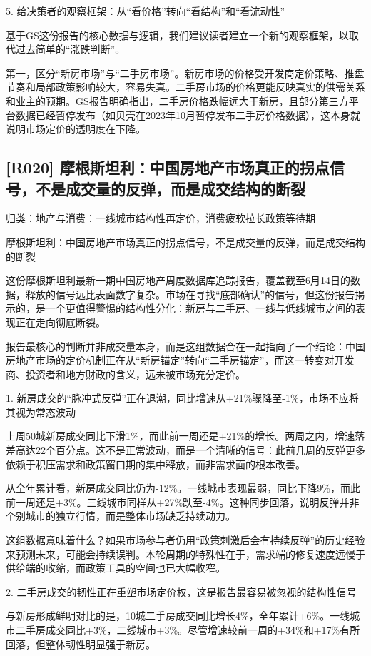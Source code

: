 \documentclass[11pt]{ctexart}
\begin{document}
5. 给决策者的观察框架：从“看价格”转向“看结构”和“看流动性”

基于GS这份报告的核心数据与逻辑，我们建议读者建立一个新的观察框架，以取代过去简单的“涨跌判断”。

第一，区分“新房市场”与“二手房市场”。新房市场的价格受开发商定价策略、推盘节奏和局部政策影响较大，容易失真。二手房市场的价格更能反映真实的供需关系和业主的预期。GS报告明确指出，二手房价格跌幅远大于新房，且部分第三方平台数据已经暂停发布（如贝壳在2023年10月暂停发布二手房价格数据），这本身就说明市场定价的透明度在下降。

\subsection{[R020] 摩根斯坦利：中国房地产市场真正的拐点信号，不是成交量的反弹，而是成交结构的断裂}
{\small\color{refgray}归类：地产与消费：一线城市结构性再定价，消费疲软拉长政策等待期}

摩根斯坦利：中国房地产市场真正的拐点信号，不是成交量的反弹，而是成交结构的断裂

这份摩根斯坦利最新一期中国房地产周度数据库追踪报告，覆盖截至6月14日的数据，释放的信号远比表面数字复杂。市场在寻找“底部确认”的信号，但这份报告揭示的，是一个更值得警惕的结构性分化：新房与二手房、一线与低线城市之间的表现正在走向彻底断裂。

报告最核心的判断并非成交量本身，而是这组数据合在一起指向了一个结论：中国房地产市场的定价机制正在从“新房锚定”转向“二手房锚定”，而这一转变对开发商、投资者和地方财政的含义，远未被市场充分定价。

1. 新房成交的“脉冲式反弹”正在退潮，同比增速从+21\%骤降至-1\%，市场不应将其视为常态波动

上周50城新房成交同比下滑1\%，而此前一周还是+21\%的增长。两周之内，增速落差高达22个百分点。这不是正常波动，而是一个清晰的信号：此前几周的反弹更多依赖于积压需求和政策窗口期的集中释放，而非需求面的根本改善。

从全年累计看，新房成交同比仍为-12\%。一线城市表现最弱，同比下降9\%，而此前一周还是+3\%。三线城市同样从+27\%跌至-4\%。这种同步回落，说明反弹并非个别城市的独立行情，而是整体市场缺乏持续动力。

这组数据意味着什么？如果市场参与者仍用“政策刺激后会有持续反弹”的历史经验来预测未来，可能会持续误判。本轮周期的特殊性在于，需求端的修复速度远慢于供给端的收缩，而政策工具的空间也已大幅收窄。

2. 二手房成交的韧性正在重塑市场定价权，这是报告最容易被忽视的结构性信号

与新房形成鲜明对比的是，10城二手房成交同比增长4\%，全年累计+6\%。一线城市二手房成交同比+3\%，二线城市+3\%。尽管增速较前一周的+34\%和+17\%有所回落，但整体韧性明显强于新房。
\end{document}
